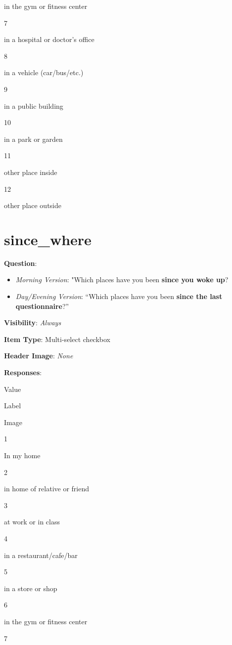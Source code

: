 \documentclass[]{book}
\providecommand{\tightlist}{%
  \setlength{\itemsep}{0pt}\setlength{\parskip}{0pt}}
\begin{document}
in the gym or fitness center

7

in a hospital or doctor's office

8

in a vehicle (car/bus/etc.)

9

in a public building

10

in a park or garden

11

other place inside

12

other place outside

\hypertarget{since_where}{%
\section{since\_where}\label{since_where}}

\textbf{Question}:

\begin{itemize}
\tightlist
\item
  \emph{Morning Version}: "Which places have you been \textbf{since you woke up}?
\item
  \emph{Day/Evening Version}: ``Which places have you been \textbf{since the last questionnaire}?''
\end{itemize}

\textbf{Visibility}: \emph{Always}

\textbf{Item Type}: Multi-select checkbox

\textbf{Header Image}: \emph{None}

\textbf{Responses}:

Value

Label

Image

1

In my home

2

in home of relative or friend

3

at work or in class

4

in a restaurant/cafe/bar

5

in a store or shop

6

in the gym or fitness center

7
\end{document}
